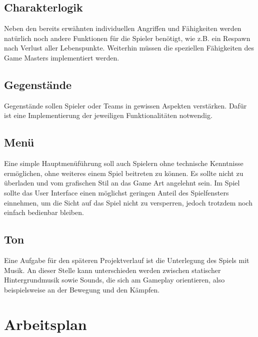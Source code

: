 \documentclass[10pt,a4paper,notitlepage]{report}
\begin{document}
\begin{flushleft}
\subsection{Charakterlogik} 
Neben den bereits erwähnten individuellen Angriffen und Fähigkeiten werden natürlich noch andere Funktionen für die Spieler benötigt, wie z.B. ein Respawn nach Verlust aller Lebenspunkte. Weiterhin müssen die speziellen Fähigkeiten des Game Masters implementiert werden.

\subsection{Gegenstände}
Gegenstände sollen Spieler oder Teams in gewissen Aspekten verstärken. Dafür ist eine Implementierung der jeweiligen Funktionalitäten notwendig.

\subsection{Menü}
Eine simple Hauptmenüführung soll auch Spielern ohne technische Kenntnisse ermöglichen, ohne weiteres einem Spiel beitreten zu können. Es sollte nicht zu überladen und vom grafischen Stil an das Game Art angelehnt sein. Im Spiel sollte das User Interface einen möglichst geringen Anteil des Spielfensters einnehmen, um die Sicht auf das Spiel nicht zu versperren, jedoch trotzdem noch einfach bedienbar bleiben. 

\subsection{Ton} 
Eine Aufgabe für den späteren Projektverlauf ist die Unterlegung des Spiels mit Musik. An dieser Stelle kann unterschieden werden zwischen statischer Hintergrundmusik sowie Sounds, die sich am Gameplay orientieren, also beispielsweise an der Bewegung und den Kämpfen.
\section{Arbeitsplan}


\end{flushleft}
\end{document}
